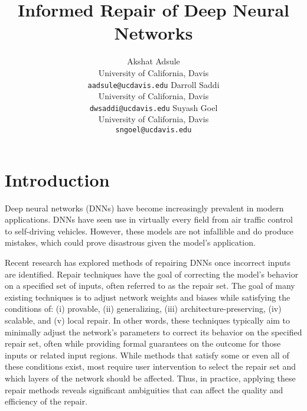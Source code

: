 \documentclass{article}
\title{Informed Repair of Deep Neural Networks}
\begin{document}
\author{
	Akshat Adsule \\
	University of California, Davis \\
	\texttt{aadsule@ucdavis.edu}
	\And
	Darroll Saddi \\
	University of California, Davis \\
	\texttt{dwsaddi@ucdavis.edu}
	\And
	Suyash Goel \\
	University of California, Davis \\
	\texttt{sngoel@ucdavis.edu}
}

\maketitle


\section{Introduction}

Deep neural networks (DNNs) have become increasingly prevalent in modern applications.
DNNs have seen use in virtually every field from air traffic control to self-driving vehicles.
However, these models are not infallible and do produce mistakes, which could prove disastrous given the model's application.

Recent research \cite{nawas_provable_2024, sotoudeh_provable_2021, tao_architecture-preserving_2023} has explored methods of repairing DNNs once incorrect inputs are identified.
Repair techniques have the goal of correcting the model's behavior on a specified set of inputs, often referred to as the repair set.
The goal of many existing techniques is to adjust network weights and biases while satisfying the conditions of: (i) provable, (ii) generalizing, (iii) architecture-preserving, (iv) scalable, and (v) local repair.
In other words, these techniques typically aim to minimally adjust the network's parameters to correct its behavior on the specified repair set, often while providing formal guarantees on the outcome for those inputs or related input regions.
While methods that satisfy some or even all of these conditions exist, most require user intervention to select the repair set and which layers of the network should be affected.
Thus, in practice, applying these repair methods reveals significant ambiguities that can affect the quality and efficiency of the repair.
\end{document}

